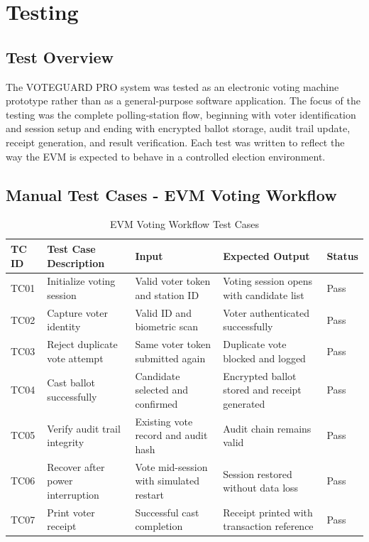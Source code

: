 \chapter{Testing}

\section{Test Overview}
The VOTEGUARD PRO system was tested as an electronic voting machine prototype rather than as a general-purpose software application. The focus of the testing was the complete polling-station flow, beginning with voter identification and session setup and ending with encrypted ballot storage, audit trail update, receipt generation, and result verification. Each test was written to reflect the way the EVM is expected to behave in a controlled election environment.

\section{Manual Test Cases - EVM Voting Workflow}

\begin{table}[htbp]
\centering
\caption{EVM Voting Workflow Test Cases}
\begin{tabular}{p{}|p{}|p{}|p{}|p{}}
\toprule
\textbf{TC ID} & \textbf{Test Case Description} & \textbf{Input} & \textbf{Expected Output} & \textbf{Status} \\
\midrule
TC01 & Initialize voting session & Valid voter token and station ID & Voting session opens with candidate list & Pass \\
\midrule
TC02 & Capture voter identity & Valid ID and biometric scan & Voter authenticated successfully & Pass \\
\midrule
TC03 & Reject duplicate vote attempt & Same voter token submitted again & Duplicate vote blocked and logged & Pass \\
\midrule
TC04 & Cast ballot successfully & Candidate selected and confirmed & Encrypted ballot stored and receipt generated & Pass \\
\midrule
TC05 & Verify audit trail integrity & Existing vote record and audit hash & Audit chain remains valid & Pass \\
\midrule
TC06 & Recover after power interruption & Vote mid-session with simulated restart & Session restored without data loss & Pass \\
\midrule
TC07 & Print voter receipt & Successful cast completion & Receipt printed with transaction reference & Pass \\
\bottomrule
\end{tabular}
\end{table}

